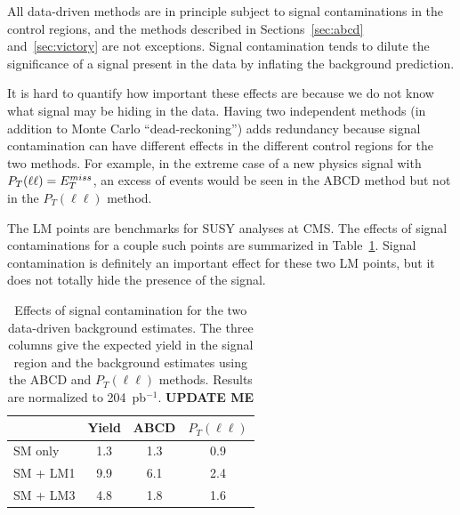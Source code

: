 All data-driven methods are in principle subject to signal contaminations
in the control regions, and the methods described in 
Sections~\ref{sec:abcd} and~\ref{sec:victory} are not exceptions.
Signal contamination tends to dilute the significance of a signal
present in the data by inflating the background prediction.

It is hard to quantify how important these effects are because we 
do not know what signal may be hiding in the data.  Having two
independent methods (in addition to Monte Carlo ``dead-reckoning'')
adds redundancy because signal contamination can have different effects
in the different control regions for the two methods.
For example, in the extreme case of a
new physics signal 
with $P_T(\ell \ell) = E_{T}^{miss}$, an excess of events would be seen 
in the ABCD method but not in the $P_T(\ell \ell)$ method.


The LM points are benchmarks for SUSY analyses at CMS.  The effects
of signal contaminations for a couple such points are summarized
in Table~\ref{tab:sigcont}. Signal contamination is definitely an important
effect for these two LM points, but it does not totally hide the
presence of the signal.


\begin{table}[htb]
\begin{center}
\caption{\label{tab:sigcont} Effects of signal contamination 
for the two data-driven background estimates. The three columns give
the expected yield in the signal region and the background estimates
using the ABCD and $P_T(\ell \ell)$ methods. Results are normalized to 204~pb$^{-1}$.
{\color{red} \bf UPDATE ME }
}
\begin{tabular}{lccc}
\hline
            &      Yield      &      ABCD    & $P_T(\ell \ell)$  \\
\hline
SM only     &       1.3      &      1.3    &       0.9        \\
SM + LM1    &       9.9      &      6.1    &       2.4        \\
SM + LM3    &       4.8      &      1.8    &       1.6        \\
\hline
\end{tabular}
\end{center}
\end{table}

